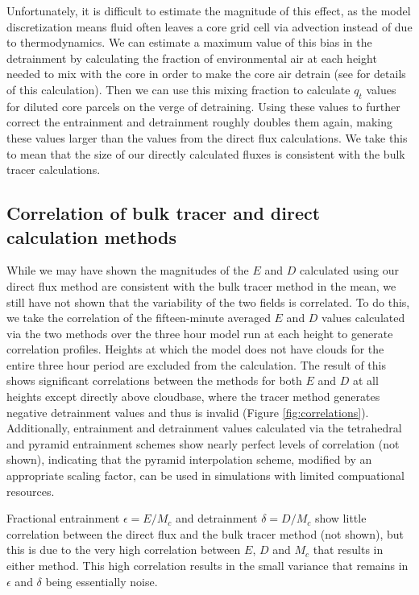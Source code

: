 \documentclass[12pt]{article}
\begin{document}
Unfortunately, it is difficult to estimate the magnitude of this effect, as the
model discretization means fluid often leaves a core grid cell via advection
instead of due to thermodynamics.  We can estimate a maximum value of this bias
in the detrainment by calculating the fraction of environmental air at each
height needed to mix with the core in order to make the core air detrain (see
\cite{Rooy2008} for details of this calculation).  Then we can use this mixing
fraction to calculate $q_t$ values for diluted core parcels on the verge of
detraining.  Using these values to further correct the entrainment and
detrainment roughly doubles them again, making these values larger than the 
values from the direct flux calculations.  We take this to mean that the size
of our directly calculated fluxes is consistent with the bulk tracer
calculations.


\subsection{Correlation of bulk tracer and direct calculation methods}

While we may have shown the magnitudes of the $E$ and $D$ calculated using our
direct flux method are consistent with the bulk tracer method in the mean, we
still have not shown that the variability of the two fields is correlated.  To
do this, we take the correlation of the fifteen-minute averaged $E$ and $D$
values calculated via the two methods over the three hour model run at each
height to generate correlation profiles.  Heights at which the model does not
have clouds for the entire three hour period are excluded from the
calculation.  The result of this shows significant correlations between the
methods for both $E$ and $D$ at all heights except directly above cloudbase,
where the tracer method generates negative detrainment values and thus is
invalid (Figure \ref{fig:correlations}).  Additionally, entrainment and
detrainment values calculated via the tetrahedral and pyramid entrainment
schemes show nearly perfect levels of correlation (not shown), indicating that 
the pyramid interpolation scheme, modified by an appropriate scaling factor, 
can be used in simulations with limited compuational resources.

Fractional entrainment $\epsilon = E/M_c$ and detrainment $\delta = D/M_c$
show little correlation between the direct flux and the bulk tracer method 
(not shown), but this is due to the very high correlation between $E$, $D$ and
$M_c$ that results in either method.  This high correlation results in the 
small variance that remains in $\epsilon$ and $\delta$ being essentially noise.
\end{document}
